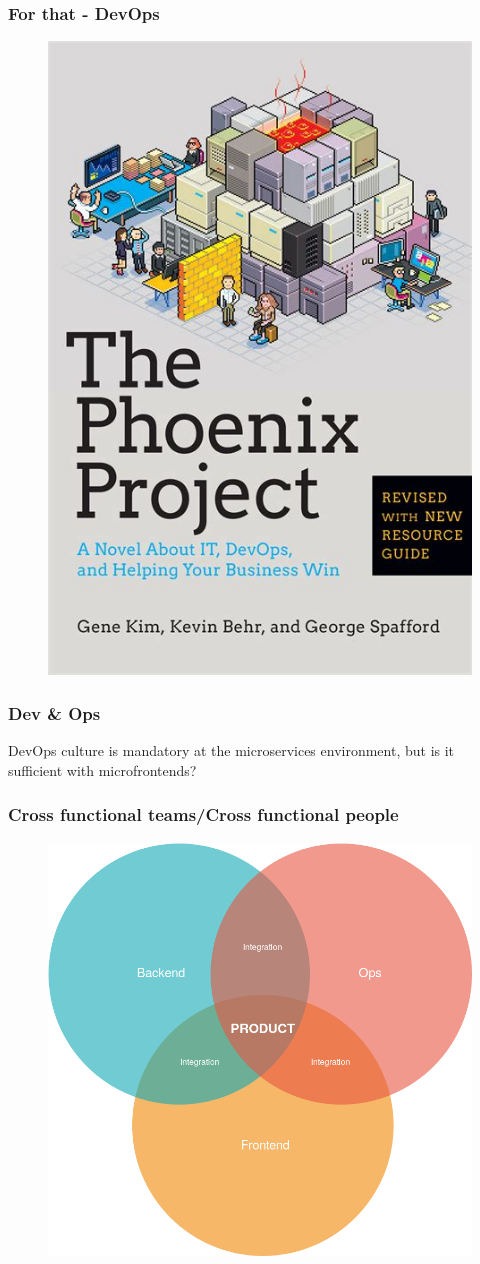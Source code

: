 
\begin{frame}
\frametitle{For that - DevOps}
\begin{figure}
	\centering
	\includegraphics[width=0.4\linewidth]{pictures/fenix.jpeg}
\end{figure}


\end{frame}

\begin{frame}
\frametitle{Dev \& Ops }
DevOps culture is mandatory at the microservices environment, but is it sufficient with microfrontends?
\end{frame}

\begin{frame}
\frametitle{Cross functional teams/Cross functional people}
\pause
\begin{figure}
	\centering
	\includegraphics[width=0.7\linewidth]{pictures/fullstack}

	\label{fig:fullstack}
\end{figure}

\end{frame}